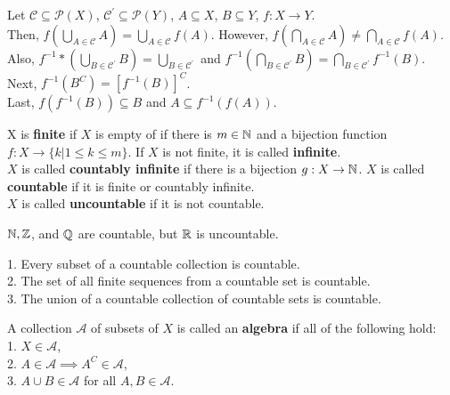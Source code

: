 \begin{proposition}
	Let $\mathscr{C} \subseteq \mathscr{P}\left( X \right) $, $\mathscr{C}^{\prime} \subseteq \mathscr{P} \left( Y \right) $, $A\subseteq X$, $B\subseteq Y$, $f: X \to Y$.\\
	Then, $f\left( \bigcup _{A \in \mathscr{C}} A \right) = \bigcup _{A \in \mathscr{C}} f\left( A \right)   $. However, $f\left( \bigcap _{A \in \mathscr{C}} A \right) \neq \bigcap _{A \in \mathscr{C}} f\left( A \right)   $.\\
	Also, $f^{-1}*\left( \bigcup_{B \in \mathscr{C}^{\prime}} B \right) = \bigcup_{B \in \mathscr{C}^{\prime}} $ and $f^{-1}\left( \bigcap_{B \in \mathscr{C}^{\prime}} B \right) = \bigcap _{B \in \mathscr{C}^{\prime}} f^{-1}\left( B \right) $.\\
	Next, $f^{-1}\left( B^{C} \right)= \left[ f^{-1}\left( B \right)  \right]^{C}  $.\\
	Last, $f\left( f^{-1}\left( B \right)  \right) \subseteq B $ and $A \subseteq f^{-1}\left( f\left( A \right)  \right) $.
\end{proposition}
\begin{definition}[Countability]
	X is \textbf{finite} if $X$ is empty of if there is $m \in \mathbb{N}$	and a bijection function $f : X \to \{k | 1 \le k \le m\} $. If $X$ is not finite, it is called \textbf{infinite}.\\ $X$ is called \textbf{countably infinite} if there is a bijection $g: X \to \mathbb{N}$. $X$ is called \textbf{countable} if it is finite or countably infinite. \\$X$ is called \textbf{uncountable}  if it is not countable.
\end{definition}
\begin{example}
	$\mathbb{N}, \mathbb{Z}$, and $\mathbb{Q}$ are countable, but $\mathbb{R}$ is uncountable.\\
\end{example}
\begin{proposition}
	1. Every subset of a countable collection is countable.\\
	2. The set of all finite sequences from a countable set is countable.\\
	3. The union of a countable collection of countable sets is countable.\\
\end{proposition}
\begin{definition}[Algebras]
	A collection $\mathscr{A}$ of subsets of $X$ is called an \textbf{algebra} if all of the following hold:\\1. $X \in \mathscr{A}$,\\ 2. $A \in \mathscr{A} \implies A^{C} \in \mathscr{A}$,\\ 3. $A \cup B \in \mathscr{A}$ for all $A, B \in \mathscr{A}$.\\
\end{definition}
